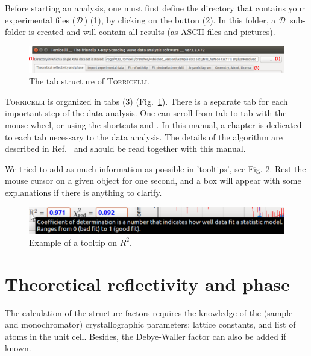 \documentclass[oldfontcommands,openany,oneside]{memoir}
\newcommand{\dirData}[1]{{\fontsize{9}{0}\selectfont\faFolderOpenO$\mathcal{D}$}$\,${\fontsize{7}{0}\selectfont\faCaretRight}\directory{#1}}
\begin{document}
Before starting an analysis, one must first define the directory that contains your experimental files (\dirData{}) (1), by clicking on the  button (2). In this folder, a \dirData{results/} sub-folder is created and will contain all results (as ASCII files and pictures).

\begin{figure}[!h]
  \centering
  \includegraphics[width=1\textwidth]{img/Screenshot_Tab.pdf}
  \caption{The tab structure of \textsc{Torricelli}.}
  \label{fig:Tab}
\end{figure}

  \textsc{Torricelli} is organized in tabs (3) (Fig.~\ref{fig:Tab}). There is a separate tab for each important step of the data analysis. One can scroll from tab to tab with the mouse wheel, or using the shortcuts  and . In this manual, a chapter is dedicated to each tab necessary to the data analysis. The details of the algorithm are described in Ref.~\cite{Bocquet2018} and should be read together with this manual.

We tried to add as much information as possible in 'tooltips', see Fig. \ref{fig:tooltip}. Rest the mouse cursor on a given object for one second, and a box will appear with some explanations if there is anything to clarify.

\begin{figure}[!h]
  \centering
  \includegraphics[width=\textwidth]{img/Screenshot_Tooltip.pdf}
  \caption{Example of a tooltip on $R^2$.}
  \label{fig:tooltip}
\end{figure}

\chapter{Theoretical reflectivity and phase} \label{chap:structureFactor}
The calculation of the structure factors requires the knowledge of the (sample and monochromator) crystallographic parameters: lattice constants, and list of atoms in the unit cell. Besides, the Debye-Waller factor can also be added if known. 
\end{document}
